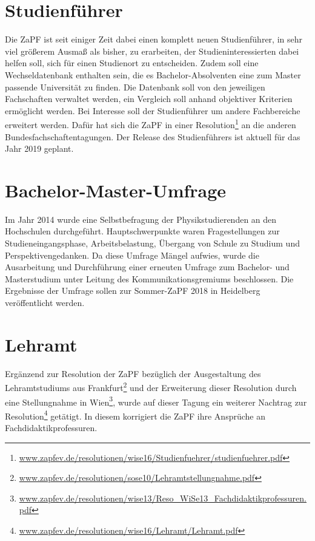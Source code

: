 \section*{Studienführer}
Die ZaPF ist seit einiger Zeit dabei einen komplett neuen Studienführer, in sehr viel größerem Ausmaß als bisher, zu erarbeiten, der Studieninteressierten 
dabei helfen soll, sich für einen Studienort zu entscheiden. Zudem soll eine Wechseldatenbank enthalten sein, die es Bachelor-Absolventen eine zum Master 
passende Universität zu finden. Die Datenbank soll von den jeweiligen Fachschaften verwaltet werden, ein Vergleich soll anhand objektiver Kriterien ermöglicht werden. 
Bei Interesse soll der Studienführer um andere Fachbereiche erweitert werden. Dafür hat sich die ZaPF in einer 
Resolution\footnote{\href{https://zapfev.de/resolutionen/wise16/Studienfuehrer/studienfuehrer.pdf}{\url{www.zapfev.de/resolutionen/wise16/Studienfuehrer/studienfuehrer.pdf}}} 
an die anderen Bundesfachschaftentagungen. Der Release des Studienführers ist aktuell für das Jahr 2019 geplant.

\section*{Bachelor-Master-Umfrage}
Im Jahr 2014 wurde eine Selbstbefragung der Physikstudierenden an den Hochschulen durchgeführt. Hauptschwerpunkte waren Fragestellungen zur Studieneingangsphase, 
Arbeitsbelastung, Übergang von Schule zu Studium und Perspektivengedanken. Da diese Umfrage Mängel aufwies, wurde die Ausarbeitung und Durchführung einer erneuten 
Umfrage zum Bachelor- und Masterstudium unter Leitung des Kommunikationsgremiums beschlossen. Die Ergebnisse der Umfrage sollen zur Sommer-ZaPF 2018 in 
Heidelberg veröffentlicht werden.

\section*{Lehramt}
Ergänzend zur Resolution der ZaPF bezüglich der Ausgestaltung des Lehramtstudiums aus 
Frankfurt\footnote{\href{https://zapfev.de/resolutionen/sose10/Lehramtstellungnahme.pdf}{\url{www.zapfev.de/resolutionen/sose10/Lehramtstellungnahme.pdf}}} 
und der Erweiterung dieser Resolution durch eine Stellungnahme in 
Wien\footnote{\href{https://zapfev.de/resolutionen/wise13/Reso_WiSe13_Fachdidaktikprofessuren.pdf}{\url{www.zapfev.de/resolutionen/wise13/Reso_WiSe13_Fachdidaktikprofessuren.pdf}}}, 
wurde auf dieser Tagung ein weiterer Nachtrag zur Resolution\footnote{\href{https://zapfev.de/resolutionen/wise16/Lehramt/Lehramt.pdf}{\url{www.zapfev.de/resolutionen/wise16/Lehramt/Lehramt.pdf}}} 
getätigt. In diesem korrigiert die ZaPF ihre Ansprüche an Fachdidaktikprofessuren. 

